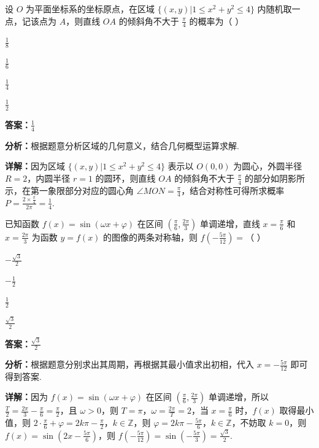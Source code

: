 \begin{question}[points=5]
设 $O$ 为平面坐标系的坐标原点，在区域 $\{(x,y)|1\le x^{2}+y^{2}\le 4\}$ 内随机取一点，记该点为 $A$，则直线 $OA$ 的倾斜角不大于 $\frac{\pi}{4}$ 的概率为（ ）
\begin{choices}
  \item $\frac{1}{8}$
  \item $\frac{1}{6}$
  \item $\frac{1}{4}$
  \item $\frac{1}{2}$
\end{choices}
\begin{solution}
\textbf{答案：}$\frac{1}{4}$

\textbf{分析：}根据题意分析区域的几何意义，结合几何概型运算求解.

\textbf{详解：}因为区域 $\{(x,y)|1\le x^{2}+y^{2}\le 4\}$ 表示以 $O(0,0)$ 为圆心，外圆半径 $R=2$，内圆半径 $r=1$ 的圆环，则直线 $OA$ 的倾斜角不大于 $\frac{\pi}{4}$ 的部分如阴影所示，在第一象限部分对应的圆心角 $\angle MON=\frac{\pi}{4}$，结合对称性可得所求概率 $P=\frac{2\times \frac{\pi}{4}}{2\pi}=\frac{1}{4}$.
\end{solution}
\end{question}

\begin{question}[points=5]
已知函数 $f(x)=\sin(\omega x+\varphi)$ 在区间 $(\frac{\pi}{6},\frac{2\pi}{3})$ 单调递增，直线 $x=\frac{\pi}{6}$ 和 $x=\frac{2\pi}{3}$ 为函数 $y=f(x)$ 的图像的两条对称轴，则 $f(-\frac{5\pi}{12})=$（ ）
\begin{choices}
  \item $-\frac{\sqrt{3}}{2}$
  \item $-\frac{1}{2}$
  \item $\frac{1}{2}$
  \item $\frac{\sqrt{3}}{2}$
\end{choices}
\begin{solution}
\textbf{答案：}$\frac{\sqrt{3}}{2}$

\textbf{分析：}根据题意分别求出其周期，再根据其最小值求出初相，代入 $x=-\frac{5\pi}{12}$ 即可得到答案.

\textbf{详解：}因为 $f(x)=\sin(\omega x+\varphi)$ 在区间 $(\frac{\pi}{6},\frac{2\pi}{3})$ 单调递增，所以 $\frac{T}{2}=\frac{2\pi}{3}-\frac{\pi}{6}=\frac{\pi}{2}$，且 $\omega>0$，则 $T=\pi$，$\omega=\frac{2\pi}{T}=2$，当 $x=\frac{\pi}{6}$ 时，$f(x)$ 取得最小值，则 $2\cdot\frac{\pi}{6}+\varphi=2k\pi-\frac{\pi}{2}$，$k\in\mathbb{Z}$，则 $\varphi=2k\pi-\frac{5\pi}{6}$，$k\in\mathbb{Z}$，不妨取 $k=0$，则 $f(x)=\sin(2x-\frac{5\pi}{6})$，则 $f(-\frac{5\pi}{12})=\sin(-\frac{5\pi}{3})=\frac{\sqrt{3}}{2}$.
\end{solution}
\end{question}

